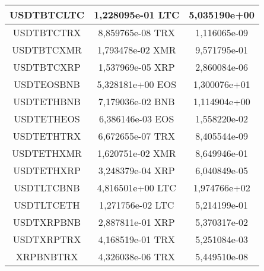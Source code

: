 \begin{table}
\begin{tabular}{|| c | c | c ||}
 \hline USDTBTCLTC & 1,228095e-01 LTC & 5,035190e+00\\ 
 \hline USDTBTCTRX & 8,859765e-08 TRX & 1,116065e-09\\ 
 \hline USDTBTCXMR & 1,793478e-02 XMR & 9,571795e-01\\ 
 \hline USDTBTCXRP & 1,537969e-05 XRP & 2,860084e-06\\ 
 \hline USDTEOSBNB & 5,328181e+00 EOS & 1,300076e+01\\ 
 \hline USDTETHBNB & 7,179036e-02 BNB & 1,114904e+00\\ 
 \hline USDTETHEOS & 6,386146e-03 EOS & 1,558220e-02\\ 
 \hline USDTETHTRX & 6,672655e-07 TRX & 8,405544e-09\\ 
 \hline USDTETHXMR & 1,620751e-02 XMR & 8,649946e-01\\ 
 \hline USDTETHXRP & 3,248379e-04 XRP & 6,040849e-05\\ 
 \hline USDTLTCBNB & 4,816501e+00 LTC & 1,974766e+02\\ 
 \hline USDTLTCETH & 1,271756e-02 LTC & 5,214199e-01\\ 
 \hline USDTXRPBNB & 2,887811e-01 XRP & 5,370317e-02\\ 
 \hline USDTXRPTRX & 4,168519e-01 TRX & 5,251084e-03\\ 
 \hline XRPBNBTRX & 4,326038e-06 TRX & 5,449510e-08\\ 
 \hline
\end{tabular}
\end{table}